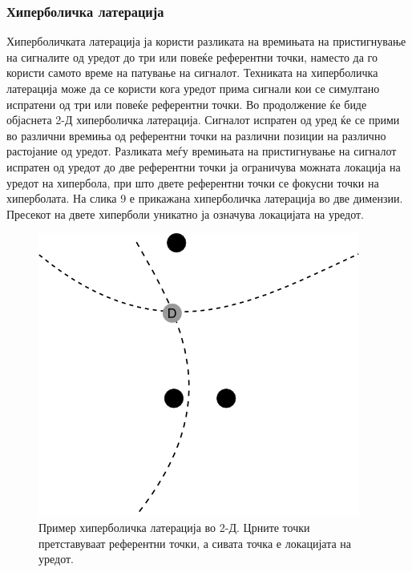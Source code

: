 \subsubsection{Хиперболичка латерација}

Хиперболичката латерација ја користи разликата на времињата на пристигнување на
сигналите од уредот до три или повеќе референтни точки, наместо да го користи
самото време на патување на сигналот. Техниката на хиперболичка латерација може
да се користи кога уредот прима сигнали кои се симултано испратени од три или
повеќе референтни точки. Во продолжение ќе биде објаснета 2-Д хиперболичка
латерација. Сигналот испратен од уред ќе се прими во различни времиња од
референтни точки на различни позиции на различно растојание од уредот. Разликата
меѓу времињата на пристигнување на сигналот испратен од уредот до две референтни
точки ја ограничува можната локација на уредот на хипербола, при што двете
референтни точки се фокусни точки на хиперболата. На слика 9 е прикажана
хиперболичка латерација во две димензии. Пресекот на двете хиперболи уникатно ја
означува локацијата на уредот.

\begin{figure}[htb]
\centering
\includegraphics[scale=0.4]{images/trilateration_h}
\caption{Пример хиперболичка латерација во 2-Д. Црните точки претставуваат референтни точки, а сивата точка е локацијата на
уредот.}
\label{fig:trilateration_h}
\end{figure}
 
